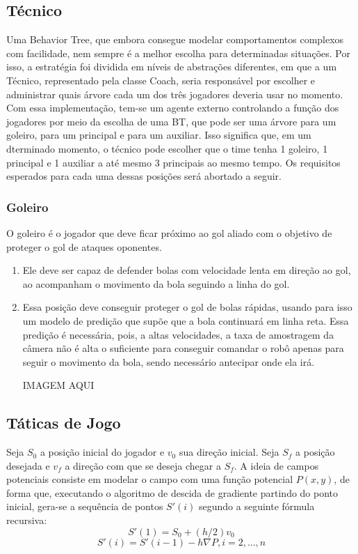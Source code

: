 \documentclass[a4paper,12pt]{article}
\begin{document}
\subsection{Técnico}

Uma Behavior Tree, que embora consegue modelar comportamentos complexos com facilidade, nem sempre é a melhor escolha para determinadas situações. Por isso, a estratégia foi dividida em níveis de abstrações diferentes, em que a um Técnico, representado pela classe Coach, seria responsável por escolher e administrar quais árvore cada um dos três jogadores deveria usar no momento.
Com essa implementação, tem-se um agente externo controlando a função dos jogadores por meio da escolha de uma BT, que pode ser uma árvore para um goleiro, para um principal e para um auxiliar. Isso significa que, em um dterminado momento, o técnico pode escolher que o time tenha 1 goleiro, 1 principal e 1 auxiliar a até mesmo 3 principais ao mesmo tempo. Os requisitos esperados para cada uma dessas posições será abortado a seguir.

\subsubsection{Goleiro} 

O goleiro é o jogador que deve ficar próximo ao gol aliado com o objetivo de proteger o gol de ataques oponentes. 
\begin{enumerate}
\item Ele deve ser capaz de defender bolas com velocidade lenta em direção ao gol, ao acompanham o movimento da bola seguindo a linha do gol. 
\item Essa posição deve conseguir proteger o gol de bolas rápidas, usando para isso um modelo de predição que supõe que a bola continuará em linha reta. Essa predição é necessária, pois, a altas velocidades, a taxa de amostragem da câmera não é alta o suficiente para conseguir comandar o robô apenas para seguir o movimento da bola, sendo necessário antecipar onde ela irá.

IMAGEM AQUI



\end{enumerate}

\subsection{Táticas de Jogo}



Seja $S_{0}$ a posição inicial do jogador e $v_{0}$ sua direção inicial. Seja $S_{f}$ a posição desejada e $v_{f}$ a direção com que se deseja chegar a $S_{f}$. A ideia de campos potenciais consiste em modelar o campo com uma função potencial $P(x,y)$, de forma que, executando o algoritmo de descida de gradiente partindo do ponto inicial, gera-se a sequência de pontos $S'(i)$ segundo a seguinte fórmula recursiva:
\begin{equation}
S'(1) = S_{0} + (h/2)v_{0}
\end{equation}
\begin{equation}
S'(i) = S'(i-1) - h\nabla P, i = 2,...,n
\end{equation}
\end{document}
